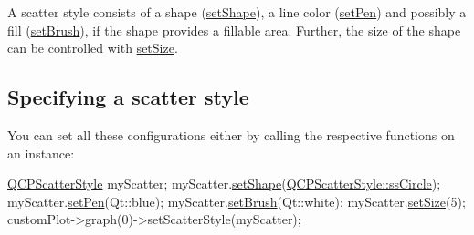 A scatter style consists of a shape (\hyperlink{class_q_c_p_scatter_style_a7c641c4d4c6d29cb705d3887cfce91c1}{set\-Shape}), a line color (\hyperlink{class_q_c_p_scatter_style_a761f1f229cc0ca4703e1e2b89f6dd1ba}{set\-Pen}) and possibly a fill (\hyperlink{class_q_c_p_scatter_style_a74d692aaeb8d4b36d6f7d510e44264b1}{set\-Brush}), if the shape provides a fillable area. Further, the size of the shape can be controlled with \hyperlink{class_q_c_p_scatter_style_aaefdd031052892c4136129db68596e0f}{set\-Size}.\hypertarget{class_q_c_p_scatter_style_QCPScatterStyle-defining}{}\subsection{Specifying a scatter style}\label{class_q_c_p_scatter_style_QCPScatterStyle-defining}
You can set all these configurations either by calling the respective functions on an instance\-: 
\begin{DoxyCode}
\hyperlink{class_q_c_p_scatter_style}{QCPScatterStyle} myScatter;
myScatter.\hyperlink{class_q_c_p_scatter_style_a7c641c4d4c6d29cb705d3887cfce91c1}{setShape}(\hyperlink{class_q_c_p_scatter_style_adb31525af6b680e6f1b7472e43859349a7c92a110880d0ef2170dff3a5b4f7779}{QCPScatterStyle::ssCircle});
myScatter.\hyperlink{class_q_c_p_scatter_style_a761f1f229cc0ca4703e1e2b89f6dd1ba}{setPen}(Qt::blue);
myScatter.\hyperlink{class_q_c_p_scatter_style_a74d692aaeb8d4b36d6f7d510e44264b1}{setBrush}(Qt::white);
myScatter.\hyperlink{class_q_c_p_scatter_style_aaefdd031052892c4136129db68596e0f}{setSize}(5);
customPlot->graph(0)->setScatterStyle(myScatter);
\end{DoxyCode}


